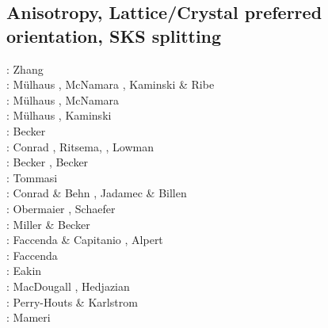 \subsection{Anisotropy, Lattice/Crystal preferred orientation, SKS splitting}
\label{sec:topics:anisotropy}

\begin{scriptsize}
\nineteeneightythree: Zhang \etal \cite{zhhj93}\\
\twothousandtwo: M\"ulhaus \etal \cite{mudm02}, McNamara \etal \cite{mcvk02}, 
                 Kaminski \& Ribe \cite{kari02}\\
\twothousandthree: M\"ulhaus \etal \cite{mumc03}, McNamara \etal \cite{mcvk03}\\
\twothousandfour: M\"ulhaus \etal \cite{mumc04}, Kaminski \etal \cite{karb04}\\
\twothousandsix: Becker \etal \cite{besb06}\\
\twothousandseven: Conrad \etal \cite{cobs07}, Ritsema, \etal \cite{rimb07}, Lowman \etal \cite{lopk07}\\
\twothousandeight: Becker \etal \cite{beke08}, Becker \cite{beck08}\\
\twothousandnine: Tommasi \etal \cite{tokv09}\\
\twothousandten: Conrad \& Behn \cite{cobe10}, Jadamec \& Billen \cite{jabi10a}\\
\twothousandeleven: Obermaier \etal \cite{obbh11}, Schaefer \etal \cite{scbb11}\\
\twothousandtwelve: Miller \& Becker \cite{mibe12}\\
\twothousandthirteen: Faccenda \& Capitanio \cite{faca13}, Alpert \etal \cite{almb13}\\
\twothousandfourteen: Faccenda \cite{facc14}\\
\twothousandfifteen: Eakin \etal \cite{ealw15}\\
\twothousandseventeen: MacDougall \etal \cite{majf17}, Hedjazian \etal \cite{hegd17}\\
\twothousandeighteen: Perry-Houts \& Karlstrom \cite{peka18}\\
\twothousandnineteen: Mameri \etal \cite{mats19}
\end{scriptsize}

